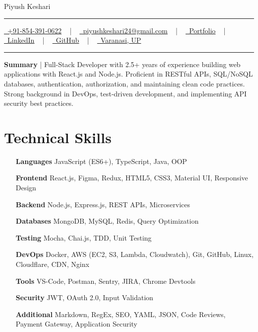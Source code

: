 \documentclass[letterpaper, 10pt]{article}
\newcommand{\documentTitle}[2]{
\begin{center}
	{\Huge\color{accentTitle} #1}
	\vspace{2pt}
	{\color{accentLine} \hrule height 0.8pt}
	\vspace{1pt}
	\footnotesize{#2}
	\vspace{1pt}
	{\color{accentLine} \hrule height 0.8pt}
\end{center}
}
\newcommand{\tinysection}[1]{ \phantomsection
\addcontentsline{toc}{section}{#1}
{\large{\bfseries\color{accentText}#1} {\color{accentLine} |}}
\vspace{0.4pt}
}
\begin{document}
	\documentTitle{Piyush Keshari}{ \href{tel:+918543910622}{\underline{ \raisebox{-0.05\height}{\faPhone}\ +91-854-391-0622}} ~ | ~ \href{mailto:piyushkeshari24@gmail.com}{\underline{ \raisebox{-0.15\height}{\faEnvelope}\ piyushkeshari24@gmail.com}} ~ | ~ \href{https://kesharipiyush24.github.io/}{\underline{ \raisebox{-0.15\height}{\faGlobe}\ Portfolio}} ~ | ~ \href{https://linkedin.com/in/piyush-k-ba3a67134}{\underline{ \raisebox{-0.15\height}{\faLinkedin}\ LinkedIn}} ~ | ~ \href{https://github.com/KeshariPiyush24}{\underline{ \raisebox{-0.15\height}{\faGithub}\ GitHub}} ~ | ~ \underline{ \raisebox{-0.15\height}{\faMapMarker}\ Varanasi, UP} }

	\tinysection{Summary} Full-Stack Developer with 2.5+ years of experience
	building web applications with React.js and Node.js. Proficient in RESTful APIs, SQL/NoSQL databases, authentication, authorization, and maintaining clean code practices. Strong background in DevOps, test-driven development, and implementing API security best practices.

	\section{Technical Skills}
	\begin{multicols}{2}
		\begin{itemize}[itemsep=-2pt, parsep=0.5pt, leftmargin=65pt]
			\item[\textbf{Languages}] JavaScript (ES6+), TypeScript, Java, OOP

			\item[\textbf{Frontend}] React.js, Figma, Redux, HTML5, CSS3, Material UI,
				Responsive Design

			\item[\textbf{Backend}] Node.js, Express.js, REST APIs, Microservices

			\item[\textbf{Databases}] MongoDB, MySQL, Redis, Query Optimization

			\item[\textbf{Testing}] Mocha, Chai.js, TDD, Unit Testing

			\item[\textbf{DevOps}] Docker, AWS (EC2, S3, Lambda, Cloudwatch), Git, GitHub,
				Linux, Cloudflare, CDN, Nginx

			\item[\textbf{Tools}] VS-Code, Postman, Sentry, JIRA, Chrome Devtools

			\item[\textbf{Security}] JWT, OAuth 2.0, Input Validation

			\item[\textbf{Additional}] Markdown, RegEx, SEO, YAML, JSON, Code Reviews,
				Payment Gateway, Application Security
		\end{itemize}
	\end{multicols}
\end{document}
